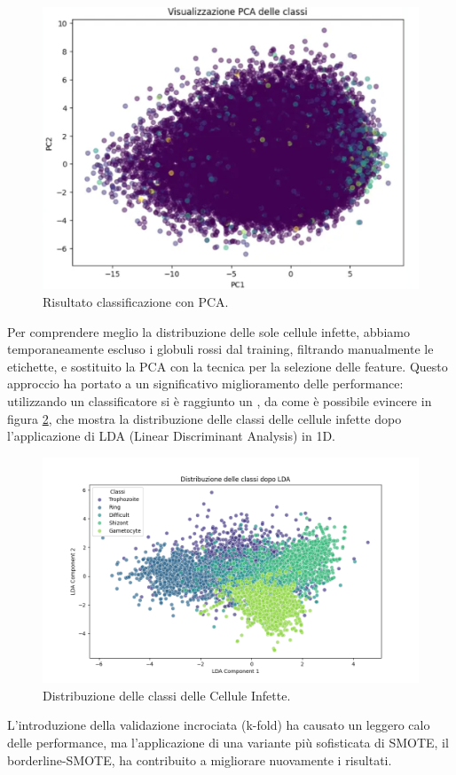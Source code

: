 \documentclass[minted, draw]{../tex/hebdomon}
\begin{document}
%
\begin{figure}[H]
	\centering
	\includegraphics[width=.5\linewidth]{figures/pca_result.png}
	\caption{Risultato classificazione con PCA.}
	\label{fig:pca_result}
\end{figure}
%


Per comprendere meglio la distribuzione delle sole cellule infette, abbiamo temporaneamente escluso i globuli rossi dal training, filtrando manualmente le etichette, e sostituito la PCA con la tecnica  per la selezione delle feature. Questo approccio ha portato a un significativo miglioramento delle performance: utilizzando un classificatore  si è raggiunto un , da come è possibile evincere in figura \ref{fig:lda_infette}, che mostra la distribuzione delle classi delle cellule infette dopo l’applicazione di LDA (Linear Discriminant Analysis) in 1D.


% 
\begin{figure}[H]
  \centering
  \includegraphics[width=.8\linewidth]{figures/lda_distribution.png}
  \caption{Distribuzione delle classi delle Cellule Infette.}
  \label{fig:lda_infette}
\end{figure}
%


L’introduzione della validazione incrociata (k-fold) ha causato un leggero calo delle performance, ma l’applicazione di una variante più sofisticata di SMOTE, il borderline-SMOTE, ha contribuito a migliorare nuovamente i risultati.
\end{document}
